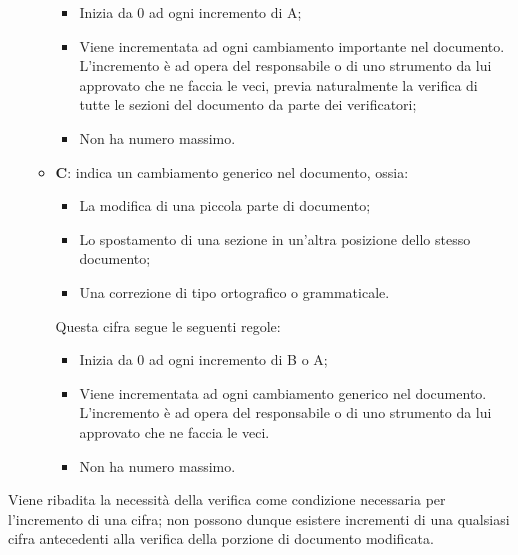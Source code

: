 \documentclass[../norme-di-progetto.tex]{subfiles}
\begin{document}
\begin{itemize}
\begin{itemize}
    \begin{itemize}
      \item Inizia da 0 ad ogni incremento di A;
      \item Viene incrementata ad ogni cambiamento importante nel documento. L'incremento è ad opera del responsabile o di uno strumento da lui approvato che ne faccia le veci, previa naturalmente la verifica di tutte le sezioni del documento da parte dei verificatori;
      \item Non ha numero massimo.
    \end{itemize}
    \item \textbf{C}: indica un cambiamento generico nel documento, ossia:
    \begin{itemize}
      \item La modifica di una piccola parte di documento;
      \item Lo spostamento di una sezione in un'altra posizione dello stesso documento;
      \item Una correzione di tipo ortografico o grammaticale.
    \end{itemize}
    Questa cifra segue le seguenti regole:
    \begin{itemize}
      \item Inizia da 0 ad ogni incremento di B o A;
      \item Viene incrementata ad ogni cambiamento generico nel documento. L'incremento è ad opera del responsabile o di uno strumento da lui approvato che ne faccia le veci.
      \item Non ha numero massimo.
    \end{itemize}
  \end{itemize}
\end{itemize}
Viene ribadita la necessità della verifica come condizione necessaria per l'incremento di una cifra; non possono dunque esistere incrementi di una qualsiasi cifra antecedenti alla verifica della porzione di documento modificata.
\end{document}
